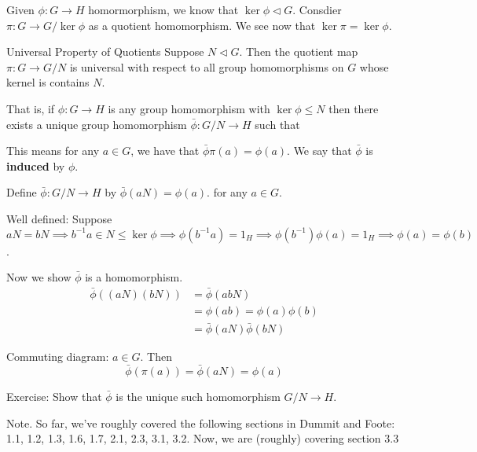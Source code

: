\documentclass{article}
\begin{document}
Given $\phi : G \to H$ homormorphism, we know that $\ker{\phi} \triangleleft G$. Consdier $\pi : G \to G / \ker{\phi}$ as a quotient homomorphism. We see now that $\ker{\pi} = \ker{\phi}$.

\begin{cthm}{Universal Property of Quotients}{}
    Suppose $N \triangleleft G$. Then the quotient map $\pi : G \to G /N$ is universal with respect to all group homomorphisms on $G$ whose kernel is contains $N$. 

    That is, if $\phi : G \to H$ is any group homomorphism with $\ker{\phi} \leq N$ then there exists a unique group homomorphism $\bar{\phi} : G/N \to H$ such that
    


    This means for any $a \in G$, we have that $\bar{\phi} \pi(a) = \phi(a)$. We say that $\bar{\phi}$ is \textbf{induced} by $\phi$. 

    \begin{cpf}
        Define $\bar{\phi} : G/N \to H$ by $\bar{\phi}(aN) = \phi(a)$. for any $a \in G$. 

        Well defined: Suppose $aN = bN \implies b^{-1}a \in N \leq \ker{\phi} \implies \phi(b^{-1}a) = 1_H \implies \phi(b^{-1})\phi(a) = 1_H \implies \phi(a) = \phi(b)$. 

        Now we show $\bar{\phi}$ is a homomorphism. 
        \begin{align*}
            \bar{\phi}\left( (aN)(bN) \right) & = \bar{\phi}(abN)\\
            & = \phi(ab) = \phi(a)\phi(b)\\
            & = \bar{\phi}(aN) \bar{\phi}(bN)
        \end{align*}

        Commuting diagram: $a \in G$. Then 
        \[
            \bar{\phi}(\pi(a)) = \bar{ \phi}(aN) = \phi(a)
        \]

        Exercise: Show that $\bar{\phi}$ is the unique such homomorphism $G/N \to H$. 
    \end{cpf}
\end{cthm}


Note. So far, we've roughly covered the following sections in Dummit and Foote: 1.1, 1.2, 1.3, 1.6, 1.7, 2.1, 2.3, 3.1, 3.2. Now, we are (roughly) covering section 3.3
\end{document}
